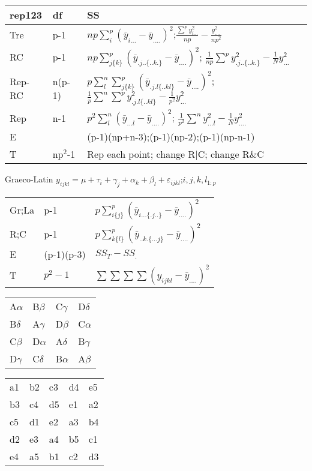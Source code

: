 \documentclass[
  10pt,
  twocolumn]{article}
\begin{document}
\begin{tabular}{l|l|l}\hline
rep123& df          & SS  \\\hline
Tre   &p-1          &$np\sum^p_{i}(\bar y_{i...}-\bar y_{....})^2$;$\frac{\sum^py_{i...}^2}{np}-\frac{y_{....}^2}{np^2}$\\
RC    &p-1          &$np\sum^p_{j\{k\}}(\bar y_{.j..\{..k.\}}-\bar y_{....})^2$; $\frac1{np}\sum^py_{.j..\{..k.\}}^2-\frac1Ny_{...}^2$\\\hline
Rep-RC&n(p-1)       &$p\sum^n_{l}\sum^p_{j\{k\}}(\bar y_{.j.l\{..kl\}}-\bar y_{....})^2$; $\frac1{p}\sum^n\sum^p y_{.j.l\{..kl\}}^2-\frac1{p^2}y_{...}^2$\\\hline
Rep   &n-1          &$p^2\sum^n_{l}(\bar y_{...l}-\bar y_{....})^2$; $\frac1{p^2}\sum^ny_{...l}^2-\frac1Ny_{....}^2$\\
E     &&(p-1)(np+n-3);(p-1)(np-2);(p-1)(np-n-1) \\
T     &np$^2$-1     & Rep each point; change R|C; change R\&C\\\hline
\end{tabular}

Graeco-Latin
\(y_{ijkl}=\mu+\tau_i+\gamma_j+\alpha_k+\beta_l+\varepsilon_{ijkl}\);\(i,j,k,l_{1:p}\)

\begin{tabular}{l|l|l}\hline
Gr;La&p-1        &$p\sum^p_{i\{j\}}(\bar y_{i...\{.j..\}}-\bar y_{....})^2$\\
R;C  &p-1        &$p\sum^p_{k\{l\}}(\bar y_{..k.\{...j\}}-\bar y_{....})^2$\\
E    &(p-1)(p-3) &$SS_T-SS_{.}$\\
T    &$p^2-1$    &$\sum\sum\sum\sum(y_{ijkl}-\bar y_{....})^2$\\ \hline
\end{tabular}
\begin{tabular}{l|l|l|l}
A$\alpha$ & B$\beta$ & C$\gamma$ & D$\delta$\\
B$\delta$ & A$\gamma$ & D$\beta$ & C$\alpha$\\
C$\beta$ & D$\alpha$ & A$\delta$ & B$\gamma$\\
D$\gamma$ & C$\delta$ & B$\alpha$ & A$\beta$
\end{tabular}
\begin{tabular}{|l|l|l|l|l}
a1 & b2 & c3 & d4 & e5 \\
b3 & c4 & d5 & e1 & a2 \\
c5 & d1 & e2 & a3 & b4 \\
d2 & e3 & a4 & b5 & c1 \\
e4 & a5 & b1 & c2 & d3 \\
\end{tabular}
\end{document}
